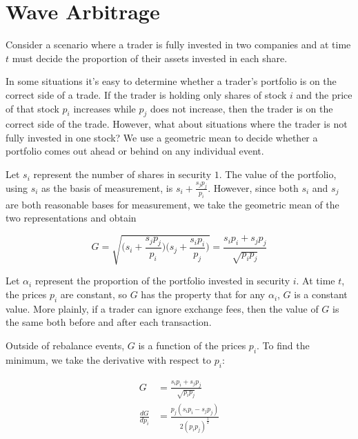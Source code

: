 \documentclass{article}
\begin{document}
\section{Wave Arbitrage}

Consider a scenario where a trader is fully invested in two companies and at
time $t$ must decide the proportion of their assets invested in each share.

In some situations it’s easy to determine whether a trader’s portfolio is on
the correct side of a trade. If the trader is holding only shares of stock $i$
and the price of that stock $p_i$ increases while $p_j$ does not increase,
then the trader is on the correct side of the trade. However, what about
situations where the trader is not fully invested in one stock? We use a
geometric mean to decide whether a portfolio comes out ahead or behind on any
individual event.

Let $s_i$ represent the number of shares in security $1$. The value of the
portfolio, using $s_i$ as the basis of measurement, is
$s_i + \frac{s_j p_j}{p_i}$. However, since both $s_i$ and $s_j$ are both
reasonable bases for measurement, we take the geometric mean of the two
representations and obtain

\begin{equation}
\label{eq:g_def}
  G = \sqrt{ \bigg( s_i + \frac{s_j p_j}{p_i} \bigg)
             \bigg( s_j + \frac{s_i p_i}{p_j} \bigg)
           }
    = \frac{s_i p_i + s_j p_j}{\sqrt{p_i p_j}}
\end{equation}

Let $\alpha_i$ represent the proportion of the portfolio invested in security
$i$. At time $t$, the prices $p_i$ are constant, so $G$ has the property that
for any $\alpha_i$, $G$ is a constant value. More plainly, if a trader can
ignore exchange fees, then the value of $G$ is the same both before and after
each transaction.

Outside of rebalance events, $G$ is a function of the prices $p_i$. To find the minimum, we take the derivative with respect to $p_i$:

\begin{equation}
\begin{aligned}
  G &= \frac{s_i p_i + s_j p_j}{\sqrt{p_i p_j}} \\
  \frac{dG}{dp_i} &= \frac{p_j (s_i p_i - s_j p_j)}{2 (p_i p_j)^{\frac{3}{2}}} \\
\end{aligned}
\end{equation}
\end{document}
